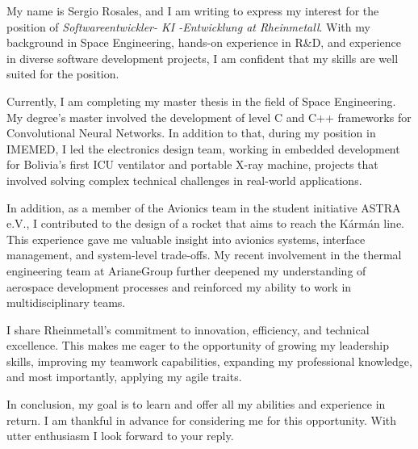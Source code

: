 


\begin{cvletter}
My name is Sergio Rosales, and I am writing to express my interest for
the position of \textit{Softwareentwickler- KI -Entwicklung at
Rheinmetall}. With my background in Space Engineering, hands-on
experience in R\&D, and experience in diverse software development
projects, I am confident that my skills are well suited for the
position.

Currently, I am completing my master thesis in the field of Space
Engineering. My degree's master involved the development of level C
and C++ frameworks for Convolutional Neural Networks. In addition to
that, during my position in IMEMED, I led the electronics design team,
working in embedded development for Bolivia's first ICU ventilator and
portable X-ray machine, projects that involved solving complex
technical challenges in real-world applications.

In addition, as a member of the Avionics team in the student
initiative ASTRA e.V., I contributed to the design of a rocket that
aims to reach the Kármán line. This experience gave me valuable
insight into avionics systems, interface management, and system-level
trade-offs. My recent involvement in the thermal engineering team at
ArianeGroup further deepened my understanding of aerospace development
processes and reinforced my ability to work in multidisciplinary
teams.

I share Rheinmetall's commitment to innovation, efficiency, and
technical excellence. This makes me eager to the opportunity of
growing my leadership skills, improving my teamwork capabilities,
expanding my professional knowledge, and most importantly, applying
my agile traits.

In conclusion, my goal is to learn and offer all my abilities and
experience in return. I am thankful in advance for considering me for
this opportunity.\hfill\break
With utter enthusiasm I look forward to your reply.
\end{cvletter}